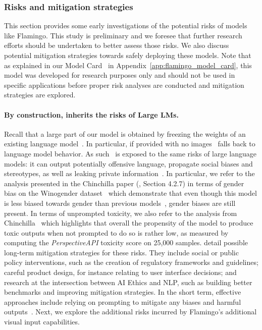 \subsubsection{Risks and mitigation strategies}
\label{sec:risks}

This section provides some early investigations of the potential risks of models like Flamingo.
This study is preliminary and we foresee that further research efforts should be undertaken to better assess those risks.
We also discuss potential mitigation strategies towards safely deploying these models.
Note that as explained in our Model Card~\citep{mitchell2019model} in Appendix~\ref{app:flamingo_model_card}, this model was developed for research purposes only and should not be used in specific applications before proper risk analyses are conducted and mitigation strategies are explored.

\paragraph{By construction, \largem{} inherits the risks of Large LMs.}
Recall that a large part of our model is obtained by freezing the weights of an existing language model~\citep{chinchilla}.
In particular, if provided with no images~\largem{} falls back to language model behavior.
As such~\largem{} is exposed to the same risks of large language models: it can output potentially offensive language, propagate social biases and stereotypes, as well as leaking private information~\citep{weidinger2021harms}.
In particular, we refer to the analysis presented in the Chinchilla paper (\citet{chinchilla}, Section 4.2.7) in terms of gender bias on the Winogender dataset~\citep{rudinger2018gender} which demonstrate that even though this model is less biased towards gender than previous models~\citep{gopher}, gender biases are still present.
In terms of unprompted toxicity, we also refer to the analysis from Chinchilla~\citep{chinchilla} which highlights that overall the propensity of the model to produce toxic outputs when not prompted to do so is rather low, as measured by computing the \emph{PerspectiveAPI} toxicity score on 25,000 samples.
\citet{weidinger2021harms} detail possible long-term mitigation strategies for these risks.
They include social or public policy interventions, such as the creation of regulatory frameworks and guidelines; careful product design, for instance relating to user interface decisions; and research at the intersection between AI Ethics and NLP, such as building better benchmarks and improving mitigation strategies. 
In the short term, effective approaches include relying on prompting to mitigate any biases and harmful outputs~\citep{gopher}.
Next, we explore the additional risks incurred by Flamingo's additional visual input capabilities.



